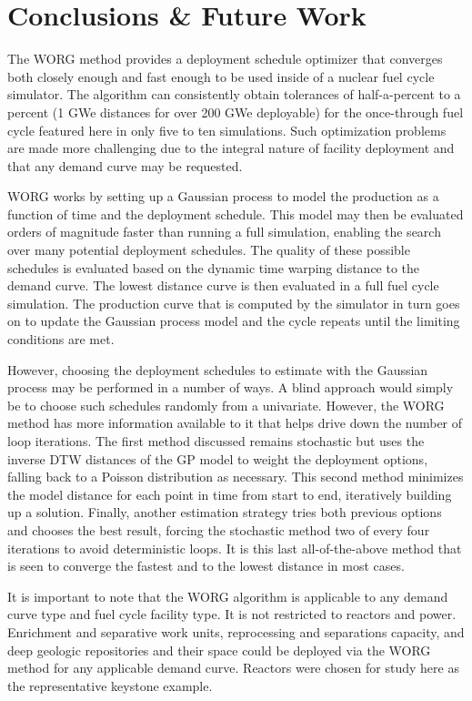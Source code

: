 \section{Conclusions \& Future Work}
\label{conclusion}

The WORG method provides a deployment schedule optimizer that converges 
both closely enough and fast enough to be used inside
of a nuclear fuel cycle simulator. The algorithm can consistently obtain
tolerances of half-a-percent to a percent (1 GWe distances for over 200 GWe
deployable) for the once-through fuel cycle featured here in only five to 
ten simulations. Such optimization problems are made
more challenging due to the integral nature of facility deployment and
that any demand curve may be requested.

WORG works by setting up a Gaussian process to model the production
as a function of time and the deployment schedule. This model may then
be evaluated orders of magnitude faster than running a full simulation, enabling
the search over many potential deployment schedules. The quality of these
possible schedules is evaluated based on the dynamic time warping distance
to the demand curve. The lowest distance curve is then evaluated in a
full fuel cycle simulation. The production curve that is computed by the 
simulator in turn goes on to update the Gaussian process model and the
cycle repeats until the limiting conditions are met.

However, choosing the deployment schedules to estimate with the Gaussian
process may be performed in a number of ways. A blind approach would
simply be to choose such schedules randomly from a univariate. However, 
the WORG method has more information available to it that helps drive 
down the number of loop iterations. The first method discussed remains 
stochastic but uses the inverse DTW distances of the GP model to 
weight the deployment options, falling back to a Poisson distribution as 
necessary. This second method minimizes the model distance for each point 
in time from start to end, iteratively building up a solution. Finally, 
another estimation strategy tries both previous options and chooses the 
best result, forcing the stochastic method two of every four iterations 
to avoid deterministic loops.  It is this last all-of-the-above method 
that is seen to converge the fastest and to the lowest distance in most 
cases.

It is important to note that the WORG algorithm is applicable to any 
demand curve type and fuel cycle facility type. It is not restricted to 
reactors and power.  Enrichment and separative work units, reprocessing
and separations capacity, and deep geologic repositories and their
space could be deployed via the WORG method for any applicable demand 
curve.  Reactors were chosen for study here as the representative keystone 
example.

